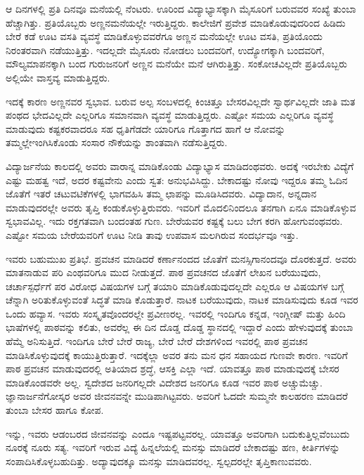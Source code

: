 {ಆ ದಿನಗಳಲ್ಲಿ ಪ್ರತಿ ದಿನವೂ ಮನೆಯಲ್ಲಿ ನೆಂಟರು. ಊರಿಂದ ವಿದ್ಯಾಭ್ಯಾಸ\-ಕ್ಕಾಗಿ ಮೈಸೂರಿಗೆ ಬರುವವರ ಸಂಖ್ಯೆ ತುಂಬಾ ಹೆಚ್ಚಾಗಿತ್ತು.  ಪ್ರತಿಯೊಬ್ಬರು ಅಣ್ಣನ\break ಮನೆಯಲ್ಲೇ ಇರುತ್ತಿದ್ದರು.  ಕಾಲೇಜಿಗೆ ಪ್ರವೇಶ ಮಾಡಿಕೊಡುವುದರಿಂದ ಹಿಡಿದು ಬೇರೆ ಕಡೆ ಊಟ   \enginline{-}   ವಸತಿ ವ್ಯವಸ್ಥೆ ಮಾಡಿಕೊಳ್ಳುವವರೆಗೂ ಅಣ್ಣನ ಮನೆಯಲ್ಲೇ ಊಟ   \enginline{-}   ವಸತಿ, ಪ್ರತಿಯೊಂದು ನಿರಂತರವಾಗಿ ನಡೆಯುತ್ತಿತ್ತು.  ಇದಲ್ಲದೇ ಮೈಸೂರು ನೋಡಲು ಬಂದವರಿಗೆ, ಉದ್ಯೋಗಕ್ಕಾಗಿ ಬಂದವರಿಗೆ, ಮೌಲ್ಯಮಾಪನಕ್ಕಾಗಿ ಬಂದ ಗುರುಜನರಿಗೆ ಅಣ್ಣನ ಮನೆಯೇ  ಮನೆ ಆಗಿರುತ್ತಿತ್ತು.  ಸಂಕೋಚವಿಲ್ಲದೇ  ಪ್ರತಿಯೊಬ್ಬರು ಅಲ್ಲಿಯೇ ವಾಸ್ತವ್ಯ ಮಾಡುತ್ತಿದ್ದರು.  

ಇದಕ್ಕೆ ಕಾರಣ ಅಣ್ಣನವರ ಸ್ವಭಾವ. ಬರುವ ಅಲ್ಪ ಸಂಬಳದಲ್ಲಿ ಕಿಂಚಿತ್ತೂ ಬೇಸರ\-ವಿಲ್ಲದೇ ಸ್ವಾರ್ಥವಿಲ್ಲದೇ ಜಾತಿ ಮತ ಪಂಥದ ಭೇದವಿಲ್ಲದೇ ಎಲ್ಲರಿಗೂ ಸಮಾನವಾಗಿ ವ್ಯವಸ್ಥೆ ಮಾಡುತ್ತಿದ್ದರು.  ಎಷ್ಟೋ ಸಮಯ ಎಲ್ಲರಿಗೂ ವ್ಯವಸ್ಥೆ ಮಾಡುವುದು ಕಷ್ಟಕರ\-ವಾದರೂ ಸಹ ಧೃತಿಗೆಡದೇ ಯಾರಿಗೂ ಗೊತ್ತಾಗದ ಹಾಗೆ ಆ ನೋವನ್ನು ತಮ್ಮಲ್ಲೇ\break ಇಂಗಿಸಿಕೊಂಡು ಸಂಸಾರ ನೌಕೆಯನ್ನು ಶಾಂತವಾಗಿ ನಡೆಸುತ್ತಿದ್ದರು.

ವಿದ್ಯಾರ್ಜನೆಯ ಕಾಲದಲ್ಲಿ ಅವರು ವಾರಾನ್ನ ಮಾಡಿಕೊಂಡು ವಿದ್ಯಾಭ್ಯಾಸ ಮಾಡಿದಂಥವರು.  ಅದಕ್ಕೆ ಇರಬೇಕು ವಿದ್ಯೆಗೆ ಎಷ್ಟು ಮಹತ್ವ ಇದೆ, ಅದರ ಕಷ್ಟವೇನು ಎಂದು ಸ್ವತ: ಅನುಭವಿಸಿದ್ದು.  ಬೇಕಾದಷ್ಟು ನೋವು ಇದ್ದರೂ ತಮ್ಮ ಓದಿನ ಜೊತೆಗೆ ಇತರೆ ಚಟುವಟಿಕೆಗಳಲ್ಲಿ ಭಾಗವಹಿಸಿ ತಮ್ಮ ಛಾಪನ್ನು ಮೂಡಿಸಿದವರು.  ವಿದ್ಯಾದಾನ, ಅನ್ನದಾನ ಮಾಡುವುದರಲ್ಲೇ ಅವರು ತೃಪ್ತಿ ಕಂಡುಕೊಳ್ಳುತ್ತಿರುವರು.  ಇವರಿಗೆ ಮೊದಲಿನಿಂದಲೂ ತನಗಾಗಿ ಏನೂ ಮಾಡಿಕೊಳ್ಳುವ ಸ್ವಭಾವವಿಲ್ಲ. ಇದು ರಕ್ತಗತವಾಗಿ ಬಂದಂತಹ ಗುಣ. ಬೇರೆಯವರ ಕಷ್ಟಕ್ಕೆ ಬಲು ಬೇಗ ಕರಗಿ ಹೋಗುವಂಥವರು. ಎಷ್ಟೋ ಸಮಯ ಬೇರೆಯವರಿಗೆ ಊಟ ನೀಡಿ ತಾವು ಉಪವಾಸ ಮಲಗಿರುವ ಸಂದರ್ಭವೂ ಇತ್ತು.  

ಇವರು ಬಹುಮುಖ ಪ್ರತಿಭೆ.   ಪ್ರವಚನ ಮಾಡಿದರೆ ಕರ್ಣಾನಂದದ ಜೊತೆಗೆ ಮನಸ್ಸಿ\-ಗಾನಂದವೂ ದೊರಕುತ್ತದೆ.  ಅವರು ಮಾತನಾಡುವ ಪರಿ ಎಂಥವರಿಗೂ ಮುದ ನೀಡುತ್ತದೆ.  ಪಾಠ   \enginline{-}   ಪ್ರವಚನದ ಜೊತೆಗೆ ಲೇಖನ ಬರೆಯುವುದು, ಚರ್ಚಾಸ್ಪರ್ಧೆಗೆ ಪರ ವಿರೋಧ ವಿಷಯಗಳ ಬಗ್ಗೆ ತಯಾರಿ ಮಾಡಿಕೊಡುವುದಲ್ಲದೇ ಎಲ್ಲರೂ ಆ ವಿಷಯಗಳ ಬಗ್ಗೆ ಚೆನ್ನಾಗಿ ಅರಿತುಕೊಳ್ಳುವಂತೆ ಸಿದ್ಧತೆ ಮಾಡಿ ಕೊಡುತ್ತಾರೆ. ನಾಟಕ ಬರೆಯುವುದು, ನಾಟಕ ಮಾಡಿಸುವುದು ಕೂಡ ಇವರ ಒಂದು ಹವ್ಯಾಸ. ಇವರು ಸಂಸ್ಕೃತವೊಂದರಲ್ಲೇ ಪ್ರವೀಣರಲ್ಲ. ಇವರಲ್ಲಿ ಇಂದಿಗೂ ಕನ್ನಡ, ಇಂಗ್ಲೀಷ್ ಮತ್ತು ಹಿಂದಿ ಭಾಷೆಗಳಲ್ಲಿ ಪಾಠವನ್ನು ಕಲಿತು, ಅವರೆಲ್ಲ ಈ ದಿನ ದೊಡ್ಡ ದೊಡ್ಡ ಸ್ಥಾನದಲ್ಲಿ ಇದ್ದಾರೆ ಎಂದು ಹೇಳುವುದಕ್ಕೆ ತುಂಬಾ ಹೆಮ್ಮೆ ಅನಿಸುತ್ತಿದೆ. ಇಂದಿಗೂ ಬೇರೆ ಬೇರೆ ರಾಜ್ಯ, ಬೇರೆ ಬೇರೆ ದೇಶಗಳಿಂದ ಇವರಲ್ಲಿ ಪಾಠ ಪ್ರವಚನ ಮಾಡಿಸಿಕೊಳ್ಳುವುದಕ್ಕೆ  ಕಾಯುತ್ತಿರುತ್ತಾರೆ.  ಇದಕ್ಕೆಲ್ಲಾ ಅವರ ತನು  \enginline{-}  ಮನ  \enginline{-}  ಧನ ಸಹಾಯದ ಗುಣವೇ ಕಾರಣ.  ಇವರಿಗೆ ಪಾಠ ಪ್ರವಚನ ಮಾಡುವುದರಲ್ಲಿ ಅತಿಯಾದ ಶ್ರದ್ಧೆ, ಆಸಕ್ತಿ ಎಲ್ಲಾ ಇದೆ.  ಯಾವತ್ತೂ ಪಾಠ ಮಾಡುವುದಕ್ಕೆ ಬೇಸರ ಮಾಡಿಕೊಂಡವರೇ ಅಲ್ಲ. ಸ್ವದೇಶದ ಜನರಿಗಲ್ಲದೇ ವಿದೇಶದ ಜನರಿಗೂ ಕೂಡ ಇವರ ಪಾಠ ಅಚ್ಚುಮೆಚ್ಚು. ಜ್ಞಾನಾರ್ಜನೆಗೋಸ್ಕರ  ಅವರ  ಜೀವನವನ್ನೇ ಮುಡಿಪಾಗಿಟ್ಟವರು.  ಅವರಿಗೆ ಓದದೇ ಸುಮ್ಮನೇ ಕಾಲಹರಣ ಮಾಡಿದರೆ ತುಂಬಾ ಬೇಸರ ಹಾಗೂ ಕೋಪ. 

ಇನ್ನು, ಇವರು ಆಡಂಬರದ ಜೀವನವನ್ನು ಎಂದೂ ಇಷ್ಟಪಟ್ಟವರಲ್ಲ. ಯಾವತ್ತೂ ಅವರಿಗಾಗಿ ಬದುಕುತ್ತಿಲ್ಲವೆಂಬುದು ನೂರಕ್ಕೆ ನೂರು ಸತ್ಯ. ಇವರಿಗೆ ಇರುವ ವಿದ್ಯೆ ಹಿನ್ನಲೆಯಲ್ಲಿ ಮನಸ್ಸು ಮಾಡಿದರೆ ಬೇಕಾದಷ್ಟು ಹಣ, ಕೀರ್ತಿಗಳನ್ನು ಸಂಪಾದಿಸಿಕೊಳ್ಳಬಹುದಿತ್ತು.  ಅದ್ಯಾವುದಕ್ಕೂ ಮನಸ್ಸು ಮಾಡಿದವರಲ್ಲ.  ಸ್ವಲ್ಪದರಲ್ಲೇ ತೃಪ್ತಿಕಾಣುವವರು. 

}
